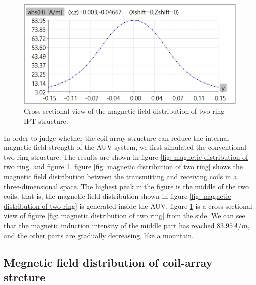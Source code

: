 \begin{figure}[!t]
    \centering
    \includegraphics[width=0.9\linewidth]{images/4_two_ring_near_field_distribution_cut.JPG}
    \caption{Cross-sectional view of the magnetic field distribution of two-ring IPT structure.}
    \label{fig: magnetic distribution of two ring cut}
\end{figure}


In order to judge whether the coil-array structure can reduce the internal magnetic field strength of the AUV system, we first simulated the conventional two-ring structure.
The results are shown in figure \ref{fig: magnetic distribution of two ring} and figure \ref{fig: magnetic distribution of two ring cut}. figure \ref{fig: magnetic distribution of two ring} shows the magnetic field distribution between the transmitting and receiving coils in a three-dimensional space. The highest peak in the figure is the middle of the two coils, that is, the magnetic field distribution shown in figure \ref{fig: magnetic distribution of two ring} is generated inside the AUV. figure \ref{fig: magnetic distribution of two ring cut} is a cross-sectional view of figure \ref{fig: magnetic distribution of two ring} from the side. We can see that the magnetic induction intensity of the middle part has reached $83.95A/m$, and the other parts are gradually decreasing, like a mountain.

\subsection{Megnetic field distribution of coil-array strcture}

